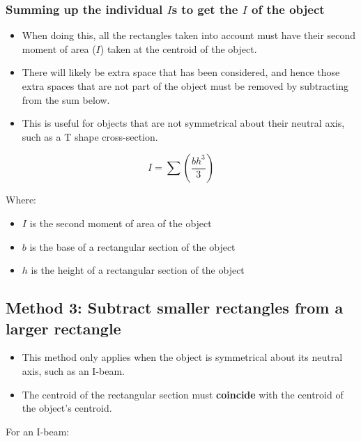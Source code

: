 \documentclass[11pt]{article}
\begin{document}
\subsubsection{Summing up the individual \(I\)s to get the \(I\) of the object}
\label{sec:orgbaaad76}
\begin{itemize}
\item When doing this, all the rectangles taken into account must have their second moment of area (\(I\)) taken at the centroid of the object.
\item There will likely be extra space that has been considered, and hence those extra spaces that are not part of the object must be removed by subtracting from the sum below.
\item This is useful for objects that are not symmetrical about their neutral axis, such as a T shape cross-section.
\end{itemize}

\[I = \sum \left( \frac{bh^3}{3} \right)\]

Where:
\begin{itemize}
\item \(I\) is the second moment of area of the object
\item \(b\) is the base of a rectangular section of the object
\item \(h\) is the height of a rectangular section of the object
\end{itemize}

\newpage
\subsection{Method 3: Subtract smaller rectangles from a larger rectangle}
\label{sec:org3da35c9}
\begin{itemize}
\item This method only applies when the object is symmetrical about its neutral axis, such as an I-beam.
\item The centroid of the rectangular section must \textbf{coincide} with the centroid of the object's centroid.
\end{itemize}

For an I-beam:
\end{document}
